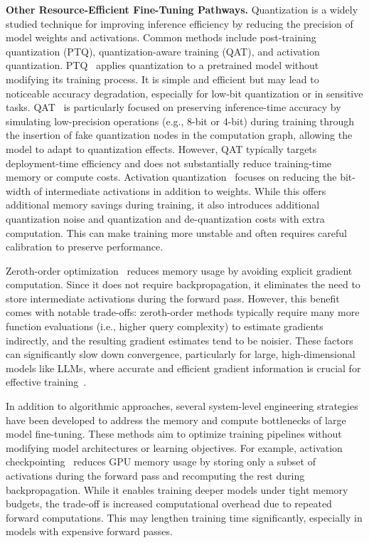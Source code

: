 \documentclass{article} %
\begin{document}
\noindent\textbf{Other Resource-Efficient Fine-Tuning Pathways.} 
Quantization is a widely studied technique for improving inference efficiency by reducing the precision of model weights and activations. Common methods include post-training quantization (PTQ), quantization-aware training (QAT), and activation quantization.
PTQ~\cite{frantar2022gptq,lin2024awq,xiao2023smoothquant} applies quantization to a pretrained model without modifying its training process. It is simple and efficient but may lead to noticeable accuracy degradation, especially for low-bit quantization or in sensitive tasks. 
QAT~\cite{nagel2022overcoming} is particularly focused on preserving inference-time accuracy by simulating low-precision operations (e.g., 8-bit or 4-bit) during training through the insertion of fake quantization nodes in the computation graph, allowing the model to adapt to quantization effects. However, QAT typically targets deployment-time efficiency and does not substantially reduce training-time memory or compute costs.
Activation quantization~\cite{choi2018pact} focuses on reducing the bit-width of intermediate activations in addition to weights. While this offers additional memory savings during training, it also introduces additional quantization noise and quantization and de-quantization costs with extra computation. This can make training more unstable and often requires careful calibration to preserve performance.

Zeroth-order optimization~\cite{xu2024fwdllm} reduces memory usage by avoiding explicit gradient computation. Since it does not require backpropagation, it eliminates the need to store intermediate activations during the forward pass. However, this benefit comes with notable trade-offs: zeroth-order methods typically require many more function evaluations (i.e., higher query complexity) to estimate gradients indirectly, and the resulting gradient estimates tend to be noisier. These factors can significantly slow down convergence, particularly for large, high-dimensional models like LLMs, where accurate and efficient gradient information is crucial for effective training~\cite{zhang2024revisiting}.

In addition to algorithmic approaches, several system-level engineering strategies have been developed to address the memory and compute bottlenecks of large model fine-tuning. These methods aim to optimize training pipelines without modifying model architectures or learning objectives. For example, activation checkpointing~\cite{chen2016training} reduces GPU memory usage by storing only a subset of activations during the forward pass and recomputing the rest during backpropagation. While it enables training deeper models under tight memory budgets, the trade-off is increased computational overhead due to repeated forward computations. This may lengthen training time significantly, especially in models with expensive forward passes.
\end{document}
